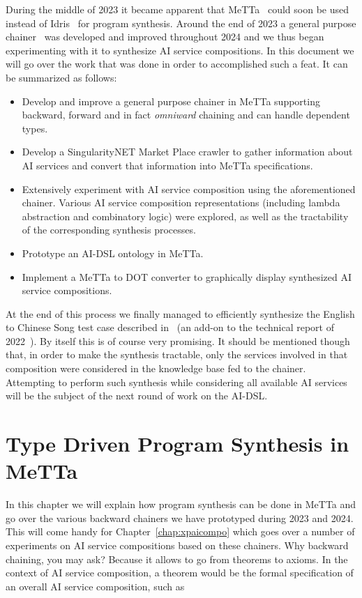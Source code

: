 \documentclass[]{report}
\begin{document}
During the middle of 2023 it became apparent that MeTTa~\cite{MeTTa}
could soon be used instead of Idris~\cite{Idris} for program
synthesis.  Around the end of 2023 a general purpose
chainer~\cite{Chaining} was developed and improved throughout 2024 and
we thus began experimenting with it to synthesize AI service
compositions.  In this document we will go over the work that was done
in order to accomplished such a feat.  It can be summarized as
follows:
\begin{itemize}
\item Develop and improve a general purpose chainer in MeTTa
  supporting backward, forward and in fact \emph{omniward} chaining
  and can handle dependent types.
\item Develop a SingularityNET Market Place crawler to gather
  information about AI services and convert that information into
  MeTTa specifications.
\item Extensively experiment with AI service composition using the
  aforementioned chainer.  Various AI service composition
  representations (including lambda abstraction and combinatory logic)
  were explored, as well as the tractability of the corresponding
  synthesis processes.
\item Prototype an AI-DSL ontology in MeTTa.
\item Implement a MeTTa to DOT converter to graphically display
  synthesized AI service compositions.
\end{itemize}
At the end of this process we finally managed to efficiently
synthesize the English to Chinese Song test case described
in~\cite{AIDSLService2023} (an add-on to the technical report of
2022~\cite{AIDSLReport2022}).  By itself this is of course very
promising.  It should be mentioned though that, in order to make the
synthesis tractable, only the services involved in that composition
were considered in the knowledge base fed to the chainer.  Attempting
to perform such synthesis while considering all available AI services
will be the subject of the next round of work on the AI-DSL.

\chapter{Type Driven Program Synthesis in MeTTa}
\label{chap:chainers}
In this chapter we will explain how program synthesis can be done in
MeTTa and go over the various backward chainers we have prototyped
during 2023 and 2024.  This will come handy for
Chapter~\ref{chap:xpaicompo} which goes over a number of experiments
on AI service compositions based on these chainers.  Why backward
chaining, you may ask?  Because it allows to go from theorems to
axioms.  In the context of AI service composition, a theorem would be
the formal specification of an overall AI service composition, such
as\\
\end{document}

